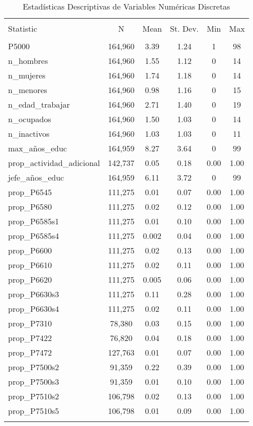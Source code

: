 
\begin{table}[!htbp] \centering 
  \caption{Estadísticas Descriptivas de Variables Numéricas Discretas} 
  \label{tab:descriptive_stats_discrete} 
\begin{tabular}{@{\extracolsep{5pt}}lccccc} 
\\[-1.8ex]\hline 
\hline \\[-1.8ex] 
Statistic & \multicolumn{1}{c}{N} & \multicolumn{1}{c}{Mean} & \multicolumn{1}{c}{St. Dev.} & \multicolumn{1}{c}{Min} & \multicolumn{1}{c}{Max} \\ 
\hline \\[-1.8ex] 
P5000 & 164,960 & 3.39 & 1.24 & 1 & 98 \\ 
n\_hombres & 164,960 & 1.55 & 1.12 & 0 & 14 \\ 
n\_mujeres & 164,960 & 1.74 & 1.18 & 0 & 14 \\ 
n\_menores & 164,960 & 0.98 & 1.16 & 0 & 15 \\ 
n\_edad\_trabajar & 164,960 & 2.71 & 1.40 & 0 & 19 \\ 
n\_ocupados & 164,960 & 1.50 & 1.03 & 0 & 14 \\ 
n\_inactivos & 164,960 & 1.03 & 1.03 & 0 & 11 \\ 
max\_años\_educ & 164,959 & 8.27 & 3.64 & 0 & 99 \\ 
prop\_actividad\_adicional & 142,737 & 0.05 & 0.18 & 0.00 & 1.00 \\ 
jefe\_años\_educ & 164,959 & 6.11 & 3.72 & 0 & 99 \\ 
prop\_P6545 & 111,275 & 0.01 & 0.07 & 0.00 & 1.00 \\ 
prop\_P6580 & 111,275 & 0.02 & 0.12 & 0.00 & 1.00 \\ 
prop\_P6585s1 & 111,275 & 0.01 & 0.10 & 0.00 & 1.00 \\ 
prop\_P6585s4 & 111,275 & 0.002 & 0.04 & 0.00 & 1.00 \\ 
prop\_P6600 & 111,275 & 0.02 & 0.13 & 0.00 & 1.00 \\ 
prop\_P6610 & 111,275 & 0.02 & 0.11 & 0.00 & 1.00 \\ 
prop\_P6620 & 111,275 & 0.005 & 0.06 & 0.00 & 1.00 \\ 
prop\_P6630s3 & 111,275 & 0.11 & 0.28 & 0.00 & 1.00 \\ 
prop\_P6630s4 & 111,275 & 0.02 & 0.11 & 0.00 & 1.00 \\ 
prop\_P7310 & 78,380 & 0.03 & 0.15 & 0.00 & 1.00 \\ 
prop\_P7422 & 76,820 & 0.04 & 0.18 & 0.00 & 1.00 \\ 
prop\_P7472 & 127,763 & 0.01 & 0.07 & 0.00 & 1.00 \\ 
prop\_P7500s2 & 91,359 & 0.22 & 0.39 & 0.00 & 1.00 \\ 
prop\_P7500s3 & 91,359 & 0.01 & 0.10 & 0.00 & 1.00 \\ 
prop\_P7510s2 & 106,798 & 0.02 & 0.13 & 0.00 & 1.00 \\ 
prop\_P7510s5 & 106,798 & 0.01 & 0.09 & 0.00 & 1.00 \\ 
\hline \\[-1.8ex] 
\end{tabular} 
\end{table} 
